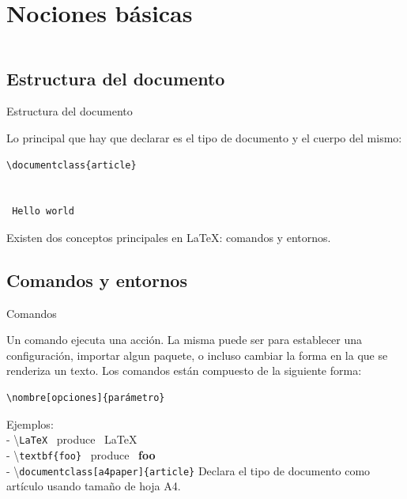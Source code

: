 \section{Nociones básicas}

\begin{frame}
    \begin{columns}[t]
        \begin{column}{.5\textwidth}
          \tableofcontents[sections={1-2},currentsection]
        \end{column}
        \begin{column}{.5\textwidth}
          \tableofcontents[sections={3-4},currentsection]
        \end{column}
    \end{columns}
\end{frame}

\subsection{Estructura del documento}
\begin{frame}[fragile]{Estructura del documento}

Lo principal que hay que declarar es el tipo de documento y el cuerpo del
mismo:

\begin{lstlisting}
\documentclass{article}


 Hello world

\end{lstlisting}

\pause
\vspace{5mm}
Existen dos conceptos principales en \LaTeX: comandos y entornos.

\end{frame}

\subsection{Comandos y entornos}
\begin{frame}[fragile]{Comandos}

Un comando ejecuta una acción. La misma puede ser para establecer una
configuración, importar algun paquete, o incluso cambiar la forma en la que se
renderiza un texto. Los comandos están compuesto de la siguiente forma:

\begin{verbatim}
\nombre[opciones]{parámetro}
\end{verbatim}

\pause

Ejemplos:\\[2mm]
- \textbackslash\texttt{LaTeX} ~produce~ \LaTeX\\
- \textbackslash\texttt{textbf\{foo\}} ~produce~ \textbf{foo}\\
- \textbackslash\texttt{documentclass[a4paper]\{article\}} Declara el tipo de documento como artículo usando tamaño de hoja A4.

\end{frame}

